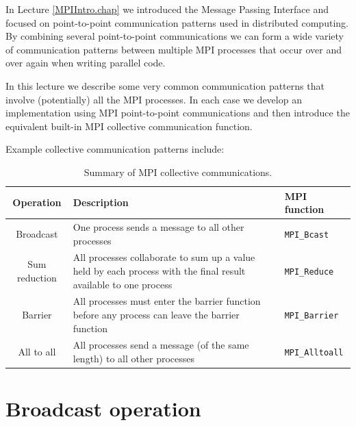 
\minitoc

In Lecture \ref{MPIIntro.chap} we introduced the Message Passing Interface and focused on point-to-point communication patterns used in distributed computing. By combining several point-to-point communications we can form a wide variety of communication patterns between multiple MPI processes that occur over and over again when writing parallel code. 

In this lecture we describe some very common communication patterns that involve (potentially) all the MPI processes. In each case we develop an implementation using MPI point-to-point communications and then introduce the equivalent built-in MPI collective communication function.

Example collective communication patterns include:

\begin{table}[htbp!]
    \centering
    \begin{tabular}{c|p{3in}|p{1in}} \hline
    {\bf Operation} & {\bf Description} & {\bf MPI function} \\ \hline
    Broadcast & One process sends a message to all other processes & \texttt{MPI\_Bcast} \\ \hline
    Sum reduction & All processes collaborate to sum up a value held by each process with the final result available to one process & \texttt{MPI\_Reduce} \\ \hline
    Barrier & All processes must enter the barrier function before any process can leave the barrier function & \texttt{MPI\_Barrier} \\
   \hline 
   All to all & All processes send a message (of the same length) to all other processes & \texttt{MPI\_Alltoall} \\ \hline
   \end{tabular}
    \caption{Summary of MPI collective communications.}
    \label{mpiCollectives.tab}
\end{table}

\section{Broadcast operation}

